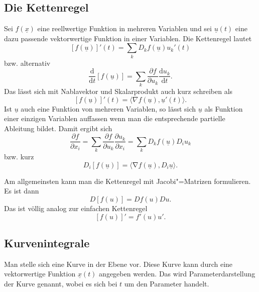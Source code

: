 \documentclass[a4paper,10pt,fleqn,twocolumn,twoside]{article}
\begin{document}
\subsection{Die Kettenregel}

Sei \(f(\underline x)\) eine reellwertige Funktion in mehreren
Variablen und sei \(\underline u(t)\) eine dazu passende
vektorwertige Funktion in einer Variablen. Die Kettenregel lautet
\[[f(\underline u)]'(t) = \sum_k D_kf(\underline u)u_k'(t)\]
bzw. alternativ
\[\frac{\mathrm d}{\mathrm dt}[f(\underline u)]
= \sum_k \frac{\partial f}{\partial u_k}\frac{\mathrm du_k}{\mathrm dt}.\]
\noindent
Das lässt sich mit Nablavektor und Skalarprodukt auch kurz schreiben als
\[[f(\underline u)]'(t)
= \langle\nabla f(\underline u),\underline u'(t)\rangle.\]
Ist \(\underline u\) auch eine Funktion von mehreren Variablen,
so lässt sich \(\underline u\)
als Funktion einer einzigen Variablen auffassen wenn man die entsprechende
partielle Ableitung bildet. Damit ergibt sich
\[\frac{\partial f}{\partial x_i}
= \sum_k\frac{\partial f}{\partial u_k}\frac{\partial u_k}{\partial x_i}
= \sum_k D_k f(\underline u) D_i u_k\]
bzw. kurz
\[D_i [f(\underline u)] = \langle\mathrm \nabla f(\underline u),
D_i\underline u\rangle.\]

\noindent
Am allgemeinsten kann man die Kettenregel mit Jacobi"=Matrizen
formulieren.
Es ist dann
\[D[f(u)] = Df(u)Du.\]
\noindent
Das ist völlig analog zur einfachen Kettenregel
\[[f(u)]' = f'(u)u'.\]

\subsection{Kurvenintegrale}

Man stelle sich eine Kurve in der Ebene vor. Diese Kurve kann durch
eine vektorwertige Funktion \(\underline x(t)\) angegeben werden.
Das wird Parameterdarstellung der Kurve genannt, wobei es sich bei
\(t\) um den Parameter handelt.
\end{document}
